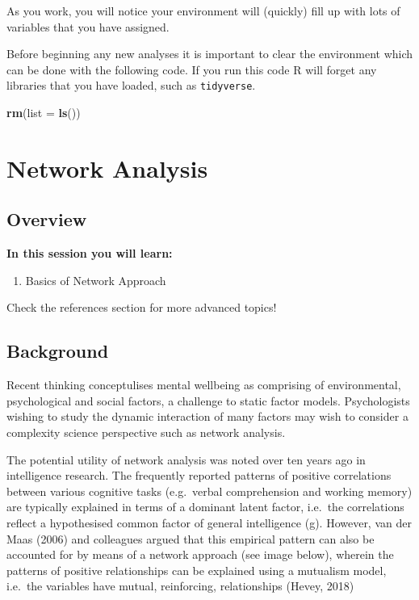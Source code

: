 \documentclass[]{book}
\newenvironment{Shaded}{\begin{snugshade}}{\end{snugshade}}
\newcommand{\DataTypeTok}[1]{\textcolor[rgb]{0.13,0.29,0.53}{#1}}
\newcommand{\KeywordTok}[1]{\textcolor[rgb]{0.13,0.29,0.53}{\textbf{#1}}}
\newcommand{\NormalTok}[1]{#1}
\providecommand{\tightlist}{%
  \setlength{\itemsep}{0pt}\setlength{\parskip}{0pt}}
\begin{document}
As you work, you will notice your environment will (quickly) fill up with lots of variables that you have assigned.

Before beginning any new analyses it is important to clear the environment which can be done with the following code. If you run this code R will forget any libraries that you have loaded, such as \texttt{tidyverse}.

\begin{Shaded}
\begin{Highlighting}[]
\KeywordTok{rm}\NormalTok{(}\DataTypeTok{list =} \KeywordTok{ls}\NormalTok{())}
\end{Highlighting}
\end{Shaded}

\hypertarget{network-analysis}{%
\chapter{Network Analysis}\label{network-analysis}}

\hypertarget{overview-3}{%
\section{Overview}\label{overview-3}}

\textbf{In this session you will learn:}

\begin{enumerate}
\def\labelenumi{\arabic{enumi}.}
\tightlist
\item
  Basics of Network Approach
\end{enumerate}

Check the references section for more advanced topics!

\hypertarget{background}{%
\section{Background}\label{background}}

Recent thinking conceptulises mental wellbeing as comprising of environmental, psychological and social factors, a challenge to static factor models. Psychologists wishing to study the dynamic interaction of many factors may wish to consider a complexity science perspective such as network analysis.

The potential utility of network analysis was noted over ten years ago in intelligence research. The frequently reported patterns of positive correlations between various cognitive tasks (e.g.~verbal comprehension and working memory) are typically explained in terms of a dominant latent factor, i.e.~the correlations reflect a hypothesised common factor of general intelligence (g). However, van der Maas (2006) and colleagues argued that this empirical pattern can also be accounted for by means of a network approach (see image below), wherein the patterns of positive relationships can be explained using a mutualism model, i.e.~the variables have mutual, reinforcing, relationships (Hevey, 2018)
\end{document}
